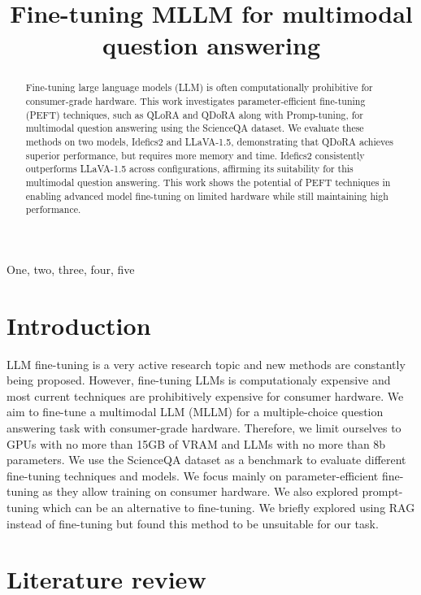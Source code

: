 \documentclass{article}
\title{Fine-tuning MLLM for multimodal question answering}
\begin{document}
%
\maketitle
%
\begin{abstract}
Fine-tuning large language models (LLM) is often computationally prohibitive for consumer-grade hardware. This work investigates parameter-efficient fine-tuning (PEFT) techniques, such as QLoRA and QDoRA along with Promp-tuning, for multimodal question answering using the ScienceQA dataset. We evaluate these methods on two models, Idefics2 and LLaVA-1.5, demonstrating that QDoRA achieves superior performance, but requires more memory and time. Idefics2 consistently outperforms LLaVA-1.5 across configurations,
affirming its suitability for this multimodal question answering.
This work shows the potential of PEFT techniques in enabling advanced model fine-tuning on limited hardware while still maintaining high performance.
\end{abstract}
%
\begin{keywords}
One, two, three, four, five
\end{keywords}
%
\section{Introduction}
\label{sec:intro}
LLM fine-tuning is a very active research topic and new methods are constantly being proposed. However, fine-tuning LLMs is computationaly expensive and most current techniques are prohibitively expensive for consumer hardware. We aim to fine-tune a multimodal LLM (MLLM) for a multiple-choice question answering task with consumer-grade hardware. Therefore, we limit ourselves to GPUs with no more than 15GB of VRAM and LLMs with no more than 8b parameters. We use the ScienceQA dataset as a benchmark to evaluate different fine-tuning techniques and models. We focus mainly on parameter-efficient fine-tuning as they allow training on consumer hardware. We also explored prompt-tuning which can be an alternative to fine-tuning. We briefly explored using RAG instead of fine-tuning but found this method to be unsuitable for our task.

\section{Literature review}
\label{sec:litreview}
\end{document}
